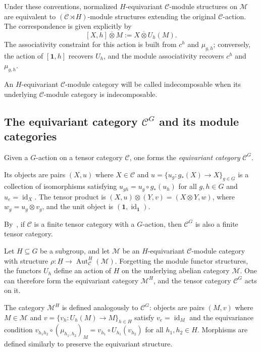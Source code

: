 \documentclass[12pt]{amsart}
\theoremstyle{plain}
\theoremstyle{definition} %
\theoremstyle{remark} %
\newcommand{\cC}{\mathcal{C}}
\newcommand{\cM}{\mathcal{M}}
\newcommand{\Aut}{\operatorname{Aut}}
\newcommand{\id}{\operatorname{id}}
\begin{document}
Under these conventions, normalized $H$-equivariant $\cC$-module structures on $\cM$ are equivalent to $(\cC\rtimes H)$-module structures extending the original $\cC$-action. The correspondence is given explicitly by
\begin{equation}\label{eq:semidirect_product_module_action}
[X,h]\overline\otimes M:=X\overline\otimes U_h(M).
\end{equation}
The associativity constraint for this action is built from $c^h$ and $\mu_{g,h}$; conversely, the action of $[\mathbf1,h]$ recovers $U_h$, and the module associativity recovers $c^h$ and $\mu_{g,h}$.

An $H$-equivariant $\cC$-module category will be called indecomposable when its underlying $\cC$-module category is indecomposable.

\subsection{The equivariant category \texorpdfstring{$\cC^G$}{CG} and its module categories}

Given a $G$-action on a tensor category $\cC$, one forms the \emph{equivariant category} \texorpdfstring{$\cC^G$}{CG}.

Its objects are pairs $(X, u)$ where $X \in \cC$ and $u = \{u_g: g_*(X) \to X\}_{g \in G}$ is a collection of isomorphisms satisfying $u_{gh} = u_g \circ g_*(u_h)$ for all $g, h \in G$ and $u_e = \id_X$. The tensor product is $(X, u) \otimes (Y, v) = (X \otimes Y, w)$, where $w_g = u_g \otimes v_g$, and the unit object is $(\mathbf{1}, \id_{\mathbf{1}})$.

By~\cite[Section~4.15 and Example~7.12.25]{EGNO15}, if $\cC$ is a finite tensor category with a $G$-action, then $\cC^G$ is also a finite tensor category.

Let $H \subseteq G$ be a subgroup, and let $\cM$ be an $H$-equivariant $\cC$-module category with structure $\rho: \underline{H} \to \Aut_{\cC}^{H}(\cM)$. Forgetting the module functor structures, the functors $U_h$ define an action of $H$ on the underlying abelian category $\cM$. One can therefore form the equivariant category $\cM^H$, and the tensor category $\cC^G$ acts on it.

The category $\cM^H$ is defined analogously to $\cC^G$: objects are pairs $(M, v)$ where $M \in \cM$ and $v = \{v_h: U_h(M) \to M\}_{h \in H}$ satisfy $v_e=\id_M$ and the equivariance condition $v_{h_1h_2} \circ (\mu_{h_1,h_2})_M = v_{h_1} \circ U_{h_1}(v_{h_2})$ for all $h_1,h_2 \in H$. Morphisms are defined similarly to preserve the equivariant structure.
\end{document}
